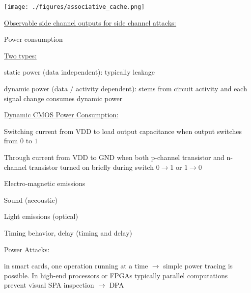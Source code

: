 \documentclass[landscape, a4paper]{article}
\begin{document}
\begin{minipage}[t]{0.2\pagewidth}

	\texttt{[image: ./figures/associative\_cache.png]}
\end{minipage}
\begin{minipage}[t]{0.2\pagewidth}
	\begin{betterlist}
		\item \underline{Observable side channel \alert{outputs} for side channel attacks:}
		\begin{betterlist}
			\item Power consumption
			\begin{betterlist}
				\item \underline{Two types:}
				\begin{betterlist}
					\item \alert{static power (data independent):} typically leakage
					\item \alert{dynamic power (data / activity dependent):} stems from circuit activity and each signal change consumes dynamic power
				\end{betterlist}
				\item \underline{Dynamic CMOS Power Consumption:}
				\begin{betterlist}
					\item \alert{Switching current} from VDD to load output capacitance when \alert{output} switches from $0$ to $1$
					\item \alert{Through current} from VDD to GND when both p-channel transistor and n-channel transistor turned on briefly during switch $0 \rightarrow 1$ or $1 \rightarrow 0$
				\end{betterlist}
			\end{betterlist}
			\item Electro-magnetic emissions
			\item Sound (accoustic)
			\item Light emissions (optical)
			\item Timing behavior, delay (timing and delay)
		\end{betterlist}
		\item \alert{Power Attacks:}
		\begin{betterlist}
			\item in \alert{smart cards}, one operation running at a time $\rightarrow$ simple power tracing is possible. In \alert{high-end processors} or \alert{FPGAs} typically parallel computations prevent visual SPA inspection $\rightarrow$ DPA

\end{betterlist}
\end{betterlist}
\end{minipage}
\end{document}

